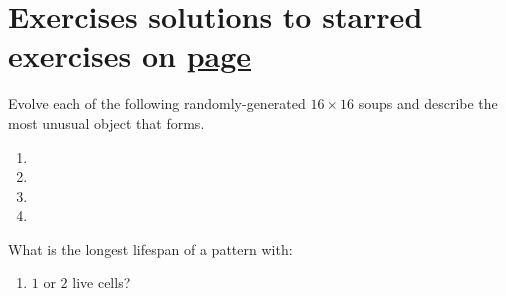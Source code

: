 \section*{Exercises \hfill \normalfont\textsf{\small solutions to starred exercises on \hyperlink{solutions_early_life}{page \pageref{solutions_early_life}}}}
\label{sec:early_life_exercises}
\vspace*{-0.4cm}\hrulefill\vspace*{-0.3cm}\footnotesize\begin{multicols}{2}\vspace*{-0.4cm}\raggedcolumns{}
	\setlength{\parskip}{0pt}
	
	\begin{problemstar}\label{exer:natural_switch_engine} 
		Evolve each of the following randomly-generated $16 \times 16$ soups and describe the most unusual object that forms.\vspace*{-0.25cm}
		
		\begin{multicols}{2}
			\begin{enumerate}
				\item[\bf\color{ocre}(a)] 
				
				\item[\bf\color{ocre}(c)] 
				
				\item[\bf\color{ocre}(b)] 
				
				\item[\bf\color{ocre}(d)] 
			\end{enumerate}
		\end{multicols}
	\end{problemstar}
	
	
	\mfilbreak
	
	
	\begin{problem}\label{exer:4_cell_methuselahs}
		What is the longest lifespan of a pattern with:\smallskip
		
		\begin{enumerate}[label=\bf\color{ocre}(\alph*)]
			\item {} $1$ or $2$ live cells?
			

\end{enumerate}
\end{problem}
\end{multicols}
